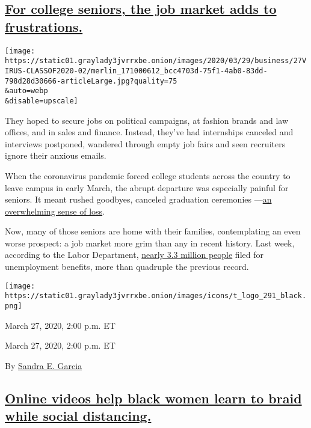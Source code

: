 \hypertarget{for-college-seniors-the-job-market-adds-to-frustrations}{%
\subsection{\texorpdfstring{\protect\hyperlink{for-college-seniors-the-job-market-adds-to-frustrations}{For
college seniors, the job market adds to
frustrations.}}{For college seniors, the job market adds to frustrations.}}\label{for-college-seniors-the-job-market-adds-to-frustrations}}

\texttt{[image: https://static01.graylady3jvrrxbe.onion/images/2020/03/29/business/27VIRUS-CLASSOF2020-02/merlin\_171000612\_bcc4703d-75f1-4ab0-83dd-798d28d30666-articleLarge.jpg?quality=75\\\&auto=webp\\\&disable=upscale]}

They hoped to secure jobs on political campaigns, at fashion brands and
law offices, and in sales and finance. Instead, they've had internships
canceled and interviews postponed, wandered through empty job fairs and
seen recruiters ignore their anxious emails.

When the coronavirus pandemic forced college students across the country
to leave campus in early March, the abrupt departure was especially
painful for seniors. It meant rushed goodbyes, canceled graduation
ceremonies
---\href{https://www.nytimes3xbfgragh.onion/2020/03/15/nyregion/cornell-university-coronavirus.html}{an
overwhelming sense of loss}.

Now, many of those seniors are home with their families, contemplating
an even worse prospect: a job market more grim than any in recent
history. Last week, according to the Labor Department,
\href{https://www.nytimes3xbfgragh.onion/2020/03/26/business/economy/coronavirus-unemployment-claims.html}{nearly
3.3 million people} filed for unemployment benefits, more than quadruple
the previous record.

\texttt{[image: https://static01.graylady3jvrrxbe.onion/images/icons/t\_logo\_291\_black.png]}

March 27, 2020, 2:00 p.m. ET

March 27, 2020, 2:00 p.m. ET

By \href{https://www.nytimes3xbfgragh.onion/by/sandra-e-garcia}{Sandra
E. Garcia}

\hypertarget{online-videos-help-black-women-learn-to-braid-while-social-distancing}{%
\subsection{\texorpdfstring{\protect\hyperlink{online-videos-help-black-women-learn-to-braid-while-social-distancing}{Online
videos help black women learn to braid while social
distancing.}}{Online videos help black women learn to braid while social distancing.}}\label{online-videos-help-black-women-learn-to-braid-while-social-distancing}}

